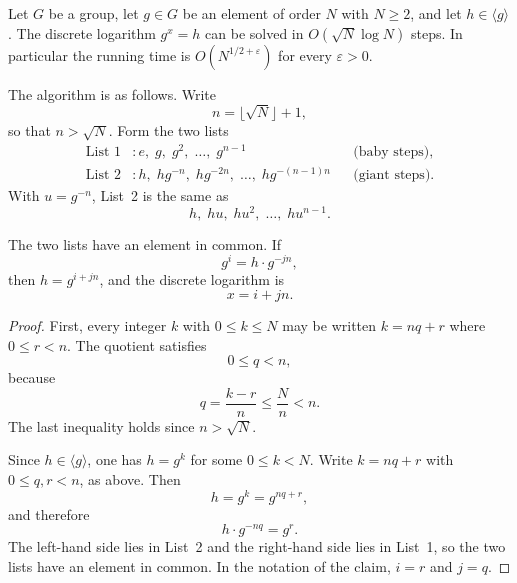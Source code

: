 
\begin{keybox}
\begin{theorem}[Shanks]
Let \(G\) be a group, let \(g\in G\) be an element of order \(N\) with
\(N\ge 2\), and let \(h\in\langle g\rangle\). The discrete logarithm
\(g^x=h\) can be solved in \(O(\sqrt{N}\log N)\) steps. In particular
the running time is \(O(N^{1/2+\varepsilon})\) for every \(\varepsilon>0\).
\end{theorem}
\end{keybox}


The algorithm is as follows. Write
\[
    n = \bigl\lfloor\sqrt{N}\bigr\rfloor + 1,
\]
so that \(n>\sqrt{N}\). Form the two lists
\begin{align*}
    \text{List 1}&\colon
        e,\; g,\; g^2,\; \ldots,\; g^{n-1}
        &&\text{(baby steps),}\\[0.3em]
    \text{List 2}&\colon
        h,\; hg^{-n},\; hg^{-2n},\; \ldots,\; hg^{-(n-1)n}
        &&\text{(giant steps).}
\end{align*}
With \(u=g^{-n}\), List~2 is the same as
\[
    h,\; hu,\; hu^2,\; \ldots,\; hu^{n-1}.
\]

\begin{claim}
The two lists have an element in common. If
\[
    g^i = h\cdot g^{-jn},
\]
then \(h=g^{i+jn}\), and the discrete logarithm is
\[
    x = i+jn.
\]
\end{claim}

\begin{proof}
First, every integer \(k\) with \(0\le k\le N\) may be written
\(k=nq+r\) where \(0\le r<n\). The quotient satisfies
\[
    0\le q < n,
\]
because
\[
    q = \frac{k-r}{n} \le \frac{N}{n} < n.
\]
The last inequality holds since \(n>\sqrt{N}\).

Since \(h\in\langle g\rangle\), one has \(h=g^k\) for some
\(0\le k<N\). Write \(k=nq+r\) with \(0\le q,r<n\), as above. Then
\[
    h = g^k = g^{nq+r},
\]
and therefore
\[
    h\cdot g^{-nq} = g^r.
\]
The left-hand side lies in List~2 and the right-hand side lies in
List~1, so the two lists have an element in common. In the notation of
the claim, \(i=r\) and \(j=q\).
\end{proof}

